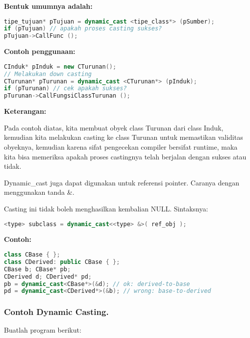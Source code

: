 \textbf{Bentuk umumnya adalah:}

\begin{lstlisting}[language=c++, numbers=none]
tipe_tujuan* pTujuan = dynamic_cast <tipe_class*> (pSumber);
if (pTujuan) // apakah proses casting sukses?
pTujuan->CallFunc ();
\end{lstlisting}

\textbf{Contoh penggunaan:}

\begin{lstlisting}[language=c++, numbers=none]
CInduk* pInduk = new CTurunan();
// Melakukan down casting
CTurunan* pTurunan = dynamic_cast <CTurunan*> (pInduk);
if (pTurunan) // cek apakah sukses?
pTurunan->CallFungsiClassTurunan ();
\end{lstlisting}

\textbf{Keterangan:}

Pada contoh diatas, kita membuat obyek class Turunan dari class Induk,
kemudian kita melakukan casting ke class Turunan untuk memastikan
validitas obyeknya, kemudian karena sifat pengecekan compiler bersifat
runtime, maka kita bisa memeriksa apakah proses castingnya telah
berjalan dengan sukses atau tidak.

Dynamic\_cast juga dapat digunakan untuk referensi pointer. Caranya
dengan menggunakan tanda \&.

Casting ini tidak boleh menghasilkan kembalian NULL. Sintaksnya:

\begin{lstlisting}[language=c++, numbers=none]
<type> subclass = dynamic_cast<<type> &>( ref_obj );
\end{lstlisting}

\textbf{Contoh:}

\begin{lstlisting}[language=c++, numbers=none]
class CBase { };
class CDerived: public CBase { };
CBase b; CBase* pb;
CDerived d; CDerived* pd;
pb = dynamic_cast<CBase*>(&d); // ok: derived-to-base
pd = dynamic_cast<CDerived*>(&b); // wrong: base-to-derived
\end{lstlisting}

\subsubsection*{Contoh Dynamic Casting.}

Buatlah program berikut:

